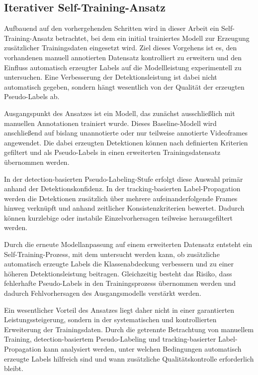 \subsection{Iterativer Self-Training-Ansatz}

Aufbauend auf den vorhergehenden Schritten wird in dieser Arbeit ein
Self-Training-Ansatz betrachtet, bei dem ein initial trainiertes Modell zur
Erzeugung zusätzlicher Trainingsdaten eingesetzt wird. Ziel dieses Vorgehens ist
es, den vorhandenen manuell annotierten Datensatz kontrolliert zu erweitern und
den Einfluss automatisch erzeugter Labels auf die Modellleistung experimentell zu
untersuchen. Eine Verbesserung der Detektionsleistung ist dabei nicht automatisch
gegeben, sondern hängt wesentlich von der Qualität der erzeugten Pseudo-Labels
ab.

Ausgangspunkt des Ansatzes ist ein Modell, das zunächst ausschließlich mit
manuellen Annotationen trainiert wurde. Dieses Baseline-Modell wird anschließend
auf bislang unannotierte oder nur teilweise annotierte Videoframes angewendet.
Die dabei erzeugten Detektionen können nach definierten Kriterien gefiltert und
als Pseudo-Labels in einen erweiterten Trainingsdatensatz übernommen werden.

In der detection-basierten Pseudo-Labeling-Stufe erfolgt diese Auswahl primär
anhand der Detektionskonfidenz. In der tracking-basierten Label-Propagation
werden die Detektionen zusätzlich über mehrere aufeinanderfolgende Frames hinweg
verknüpft und anhand zeitlicher Konsistenzkriterien bewertet. Dadurch können
kurzlebige oder instabile Einzelvorhersagen teilweise herausgefiltert werden.

Durch die erneute Modellanpassung auf einem erweiterten Datensatz entsteht ein
Self-Training-Prozess, mit dem untersucht werden kann, ob zusätzliche automatisch
erzeugte Labels die Klassenabdeckung verbessern und zu einer höheren
Detektionsleistung beitragen. Gleichzeitig besteht das Risiko, dass fehlerhafte
Pseudo-Labels in den Trainingsprozess übernommen werden und dadurch
Fehlvorhersagen des Ausgangsmodells verstärkt werden.

Ein wesentlicher Vorteil des Ansatzes liegt daher nicht in einer garantierten
Leistungssteigerung, sondern in der systematischen und kontrollierten Erweiterung
der Trainingsdaten. Durch die getrennte Betrachtung von manuellem Training,
detection-basiertem Pseudo-Labeling und tracking-basierter Label-Propagation
kann analysiert werden, unter welchen Bedingungen automatisch erzeugte Labels
hilfreich sind und wann zusätzliche Qualitätskontrolle erforderlich bleibt.

